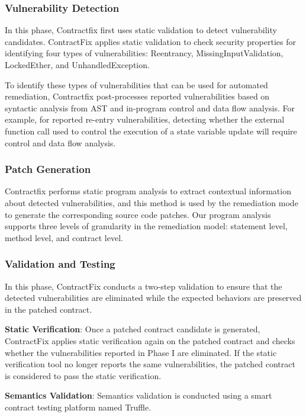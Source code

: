\documentclass[a4paper, 10pt, conference, twocolumn]{ieeeconf}       %
\begin{document}
\subsubsection{Vulnerability Detection}

In this phase, Contractfix first uses static validation to detect vulnerability candidates. 
ContractFix applies static validation to check security properties for identifying four types of vulnerabilities: Reentrancy, MissingInputValidation, LockedEther, and UnhandledException.

To identify these types of vulnerabilities that can be used for automated remediation, Contractfix post-processes reported vulnerabilities based on syntactic analysis from AST and in-program control and data flow analysis.
For example, for reported re-entry vulnerabilities, detecting whether the external function call used to control the execution of a state variable update will require control and data flow analysis.

\subsubsection{Patch Generation}

Contractfix performs static program analysis to extract contextual information about detected vulnerabilities, and this method is used by the remediation mode to generate the corresponding source code patches.
Our program analysis supports three levels of granularity in the remediation model: statement level, method level, and contract level.

\subsubsection{Validation and Testing}

In this phase, ContractFix conducts a two-step validation to ensure that the detected vulnerabilities are eliminated while the expected behaviors are preserved in the patched contract.

\textbf{Static Verification}: Once a patched contract candidate is generated, ContractFix applies static verification again on the patched contract and checks whether the vulnerabilities reported in Phase I are eliminated. If the static verification tool no longer reports the same vulnerabilities, the patched contract is considered to pass the static verification.

\textbf{Semantics Validation}: Semantics validation is conducted using a smart contract testing platform named Truffle.
\end{document}
